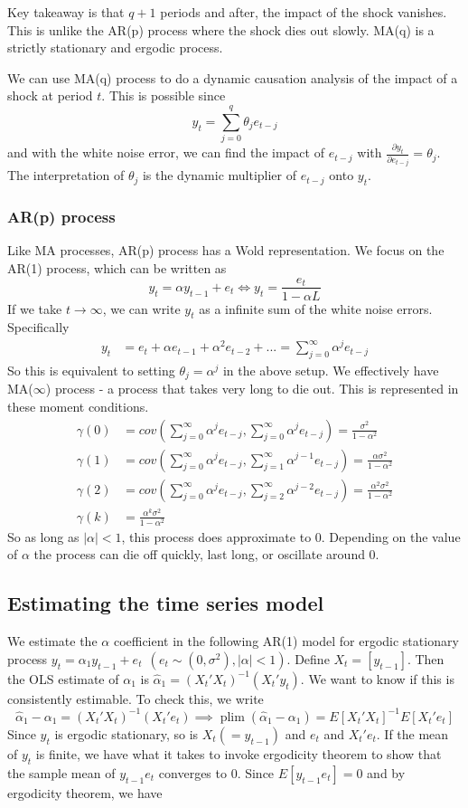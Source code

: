 \documentclass[12pt]{article}
\theoremstyle{definition}
\theoremstyle{property}
\theoremstyle{assumption}
\theoremstyle{example}
\theoremstyle{comment}
\DeclareMathOperator*{\plim}{plim}
\begin{document}
Key takeaway is that $q+1$ periods and after, the impact of the shock vanishes. This is unlike the AR(p) process where the shock dies out slowly. MA(q) is a strictly stationary and ergodic process. 
\par
We can use MA(q) process to do a dynamic causation analysis of the impact of a shock at period $t$. This is possible since
\[
y_t = \sum_{j=0}^q \theta_j e_{t-j}
\]
and with the white noise error, we can find the impact of $e_{t-j}$ with $\frac{\partial y_t}{\partial e_{t-j}}=\theta_j$. The interpretation of $\theta_j$ is the dynamic multiplier of $e_{t-j}$ onto $y_t$. 
\subsubsection{AR(p) process}
Like MA processes, AR(p) process has a Wold representation. We focus on the AR(1) process, which can be written as
\[
y_t = \alpha y_{t-1}+e_t \iff y_t = \frac{e_t}{1-\alpha L}
\]
If we take $t\to\infty$, we can write $y_t$ as a infinite sum of the white noise errors. Specifically
\[
\begin{aligned}
y_t &= e_t + \alpha e_{t-1} + \alpha^2 e_{t-2} + ...=\sum_{j=0}^\infty \alpha^je_{t-j}
\end{aligned}
\]
So this is equivalent to setting $\theta_j = \alpha^j$ in the above setup. We effectively have MA($\infty$) process - a process that takes very long to die out. This is represented in these moment conditions.
\[
\begin{aligned}
\gamma(0)&=cov\left(\sum_{j=0}^\infty \alpha^j e_{t-j},\sum_{j=0}^\infty \alpha^j e_{t-j}\right)=\frac{\sigma^2}{1-\alpha^2}\\
\gamma(1)&=cov\left(\sum_{j=0}^\infty \alpha^j e_{t-j},\sum_{j=1}^\infty \alpha^{j-1} e_{t-j}\right)=\frac{\alpha\sigma^2}{1-\alpha^2}\\
\gamma(2)&=cov\left(\sum_{j=0}^\infty \alpha^j e_{t-j},\sum_{j=2}^\infty \alpha^{j-2} e_{t-j}\right)=\frac{\alpha^2\sigma^2}{1-\alpha^2}\\
\gamma(k)&=\frac{\alpha^k\sigma^2}{1-\alpha^2}
\end{aligned}
\]
So as long as $|\alpha|<1$, this process does approximate to 0. Depending on the value of $\alpha$ the process can die off quickly, last long, or oscillate around 0. 
\subsection{Estimating the time series model}
We estimate the $\alpha$ coefficient in the following AR(1) model for ergodic stationary process $y_t= \alpha_1y_{t-1}+e_t\  \ (e_t \sim (0,\sigma^2), |\alpha|<1)$. Define $X_t = [y_{t-1}]$. Then the OLS estimate of $\alpha_1$ is $\hat{\alpha}_1=(X_t'X_t)^{-1}(X_t'y_t)$. We want to know if this is consistently estimable. To check this, we write
\[
\hat{\alpha}_1 -\alpha_1= (X_t'X_t)^{-1}(X_t'e_t) \implies \plim(\hat{\alpha}_1 -\alpha_1)= E[X_t'X_t]^{-1}E[X_t'e_t]
\]
Since $y_t$ is ergodic stationary, so is $X_t (=y_{t-1})$ and $e_t$ and $X_t'e_t$. If the mean of $y_t$ is finite, we have what it takes to invoke ergodicity theorem to show that the sample mean of $y_{t-1}e_t$ converges to 0. Since $E[y_{t-1}e_t]=0$ and by ergodicity theorem, we have
\end{document}
